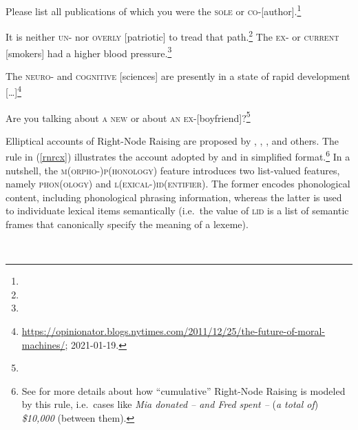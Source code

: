 \ealnoraggedright
\label{rnrex2}
\ex Please list all publications of which you were the \textsc{sole} or
\textsc{co}-[author].\footnote{}
 
\ex  It is neither \textsc{un}- nor \textsc{overly} [patriotic] to tread that path.\footnote{} 
\ex The \textsc{ex-} or \textsc{current} [smokers] had a higher blood pressure.\footnote{} 

\ex The \textsc{neuro}- and \textsc{cognitive} [sciences] are
presently in a state of rapid development
[\ldots]\footnote{\url{https://opinionator.blogs.nytimes.com/2011/12/25/the-future-of-moral-machines/};
2021-01-19.}

\ex Are you talking about \textsc{a new}  or about \textsc{an ex}-[boyfriend]?\footnote{}

\zl


Elliptical accounts of Right-Node Raising are proposed by \citet{Beavers},
\citet{Yatabe:04}, \citet{chavesrnr}, and others. The rule in (\ref{rnrcx}) illustrates the account adopted by 
 \citet[874]{chavesrnr}  and \citet*[]{aoi}
  in simplified format.\footnote{See \citet{chavesrnr} for more details about how ``cumulative'' Right-Node Raising is modeled by this rule, i.e.\
 cases like \emph{Mia donated -- and Fred spent --} (\emph{a total of}) \emph{\$10,000} (between them).
}
In a nutshell, the \textsc{m(orpho-)p(honology)} feature introduces two list-valued features, namely \textsc{phon}(\textsc{ology}) and \textsc{l(exical-)id(entifier)}. The former encodes phonological content, including phonological phrasing information,  whereas the latter is used to individuate lexical items semantically (i.e.\  the value
of \textsc{lid} is a list of semantic frames that canonically specify the meaning of a lexeme).


\eas
\label{rnrcx}%
 \impl\\
\zs

